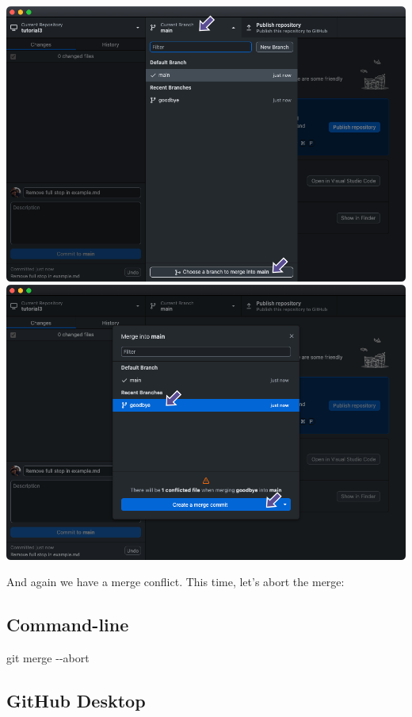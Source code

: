 \documentclass[
  letterpaper,
  DIV=11,
  numbers=noendperiod]{scrartcl}
\newenvironment{Shaded}{\begin{snugshade}}{\end{snugshade}}
\newcommand{\AttributeTok}[1]{\textcolor[rgb]{0.40,0.45,0.13}{#1}}
\newcommand{\FunctionTok}[1]{\textcolor[rgb]{0.28,0.35,0.67}{#1}}
\newcommand{\NormalTok}[1]{\textcolor[rgb]{0.00,0.23,0.31}{#1}}
\begin{document}
\includegraphics{images/image62.png}
\includegraphics{images/image63.png}

And again we have a merge conflict. This time, let's abort the merge:

\subsection{Command-line}

\begin{Shaded}
\begin{Highlighting}[]
\FunctionTok{git}\NormalTok{ merge }\AttributeTok{{-}{-}abort}
\end{Highlighting}
\end{Shaded}

\subsection{GitHub Desktop}
\end{document}
